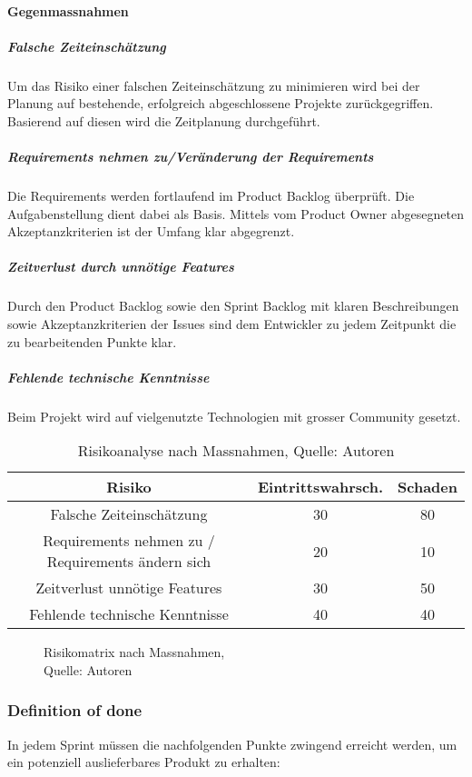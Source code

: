 \paragraph{Gegenmassnahmen}
\subparagraph{Falsche Zeiteinschätzung}
Um das Risiko einer falschen Zeiteinschätzung zu minimieren wird bei der Planung auf bestehende, erfolgreich abgeschlossene Projekte zurückgegriffen. Basierend auf diesen wird die Zeitplanung durchgeführt.  
\subparagraph{Requirements nehmen zu/Veränderung der Requirements}
Die Requirements werden fortlaufend im Product Backlog überprüft. Die Aufgabenstellung dient dabei als Basis. Mittels vom Product Owner abgesegneten Akzeptanzkriterien ist der Umfang klar abgegrenzt. 
 \subparagraph{Zeitverlust durch unnötige Features}
Durch den Product Backlog sowie den Sprint Backlog mit klaren Beschreibungen sowie Akzeptanzkriterien der Issues sind dem Entwickler zu jedem Zeitpunkt die zu bearbeitenden Punkte klar.
 \subparagraph{Fehlende technische Kenntnisse}
Beim Projekt wird auf vielgenutzte Technologien mit grosser Community gesetzt. 

\begin{table}[H]
\begin{tabularx}{\textwidth}{|C|C|C|}
\hline
\textbf{Risiko} & \textbf{Eintrittswahrsch.} & \textbf{Schaden} \\
\hline
Falsche Zeiteinschätzung &  30 & 80\\
\hline
Requirements nehmen zu / Requirements ändern sich & 20 & 10\\
\hline
Zeitverlust unnötige Features & 30 & 50\\
\hline
Fehlende technische Kenntnisse & 40 & 40\\
\hline
\end{tabularx}
\caption{ \label{tbl: RisikoanalyseNachMassnahmen}Risikoanalyse nach Massnahmen, Quelle: Autoren}
\end{table}

\begin{figure}[H]
    \centering
    \caption[RisikomatrixNach]{Risikomatrix nach Massnahmen,\\ Quelle: Autoren}
    \label{img: RisikomatrixNachher}
\end{figure}

\subsubsection{Definition of done}
In jedem Sprint müssen die nachfolgenden Punkte zwingend erreicht werden, um ein potenziell auslieferbares Produkt zu erhalten:

